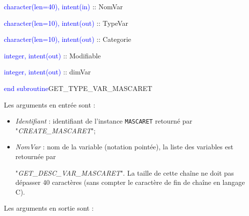 \documentclass[a4paper,11pt]{article}
\begin{document}
        \hspace{1cm} \textcolor{blue}{character(len=40), intent(in)}  :: NomVar
        
        \hspace{1cm} \textcolor{blue}{character(len=10), intent(out)}  :: TypeVar
        
        \hspace{1cm} \textcolor{blue}{character(len=10), intent(out)}  :: Categorie
        
        \hspace{1cm} \textcolor{blue}{integer, intent(out)}  :: Modifiable
        
        \hspace{1cm} \textcolor{blue}{integer, intent(out)}  :: dimVar
        
    \textcolor{blue}{end subroutine}GET\_TYPE\_VAR\_MASCARET
    
 \vspace{0.5cm}
 
 Les arguments en entr\'ee sont :
 
 \vspace{0.5cm}
 
 \begin{itemize}
 
    \item \textit{Identifiant} : identifiant de l'instance \texttt{MASCARET} retourn\'e par "\textit{CREATE\_MASCARET}";
    \vspace{0.5cm}
    \item \textit{NomVar} : nom de la variable (notation point\'ee), la liste des variables est retourn\'ee par 
    
    "\textit{GET\_DESC\_VAR\_MASCARET}". La taille de cette cha\^ine ne doit pas d\'epasser 40 caract\`eres (sans compter le caract\`ere de fin de cha\^ine en langage C).
 \end{itemize}
 
 \vspace{0.5cm}
 
 Les arguments en sortie sont :
 
 \vspace{0.5cm}
 
\end{document}
